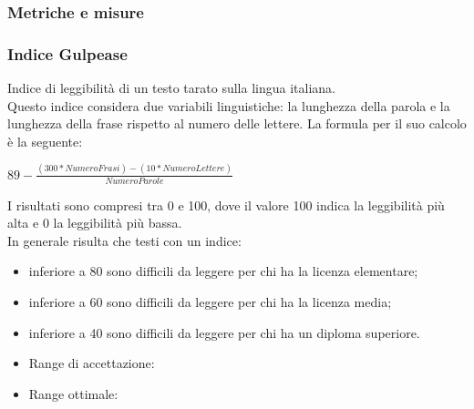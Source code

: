 \documentclass[a4paper,11pt]{article}
\begin{document}
\begin{itemize}

\subsubsection{Metriche e misure}
\subsubsection{Indice Gulpease} Indice di leggibilità di un testo tarato sulla lingua italiana. \\
Questo indice considera due variabili linguistiche: la lunghezza della parola e la lunghezza della frase rispetto al numero delle lettere.
La formula per il suo calcolo è la seguente:\\
\begin{center}
\begin{math}
89 - \frac{(300 * NumeroFrasi) - (10 * NumeroLettere)}{NumeroParole}
\end{math}
\end{center}
I risultati sono compresi tra 0 e 100, dove il valore 100 indica la leggibilità più alta e 0 la leggibilità più bassa.\\
In generale risulta che testi con un indice:
\begin{itemize}
\item inferiore a 80 sono difficili da leggere per chi ha la licenza elementare;
\item inferiore a 60 sono difficili da leggere per chi ha la licenza media;
\item inferiore a 40 sono difficili da leggere per chi ha un diploma superiore.
\end{itemize}
\begin{itemize}
\item Range di accettazione: \begin{math}[50 - 100]\end{math}
\item Range ottimale: \begin{math}[60 - 100]\end{math}
\end{itemize}
\newpage



\end{itemize}
\end{document}
